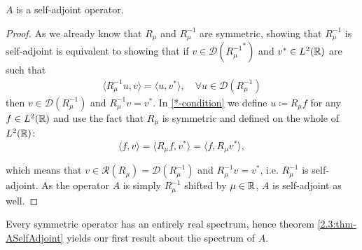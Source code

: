 \begin{theorem} \label{2.3:thm-ASelfAdjoint}
	$A$ is a self-adjoint operator.
		
	\begin{proof}
		As we already know that $R_{\mu}$ and $R_{\mu}^{-1}$ are symmetric, showing that $R_{\mu}^{-1}$ is self-adjoint is equivalent to showing that if $v \in \mathcal{D}({R_{\mu}^{-1}}^{*})$ and $v^{*} \in L^{2}(\mathbb{R})$ are such that
		\begin{align}
			\langle R_{\mu}^{-1} u, v \rangle = \langle u, v^{*} \rangle, \quad \forall u \in \mathcal{D}(R_{\mu}^{-1}) \label{*-condition}
		\end{align}
		then $v \in \mathcal{D}(R_{\mu}^{-1})$ and $R_{\mu}^{-1} v = v^{*}$.
		In \eqref{*-condition} we define $u \coloneqq R_{\mu} f$ for any $f \in L^{2}(\mathbb{R})$ and use the fact that $R_{\mu}$ is symmetric and defined on the whole of $L^{2}(\mathbb{R})$:
		\[  \langle f, v \rangle = \langle R_{\mu} f, v^{*} \rangle = \langle f, R_{\mu} v^{*} \rangle, \]
		
		which means that $v \in \mathcal{R}(R_{\mu}) = \mathcal{D}(R_{\mu}^{-1})$ and $R_{\mu}^{-1} v = v^{*}$, i.e. $R_{\mu}^{-1}$ is self-adjoint. As the operator $A$ is simply $R_{\mu}^{-1}$ shifted by $\mu \in \mathbb{R}$, $A$ is self-adjoint as well.		
	\end{proof}
\end{theorem}
Every symmetric operator has an entirely real spectrum, hence theorem \ref{2.3:thm-ASelfAdjoint} yields our first result about the spectrum of $A$.